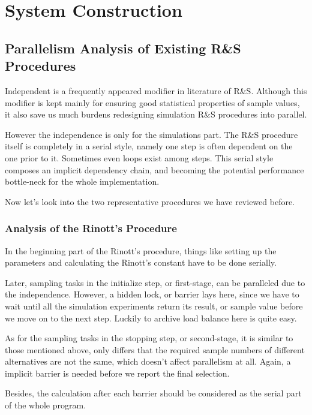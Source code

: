\chapter{System Construction}

\section{Parallelism Analysis of Existing R\&S Procedures}

Independent is a frequently appeared modifier in literature of R\&S. Although this modifier is kept mainly for ensuring good statistical properties of sample values, it also save us much burdens redesigning simulation R\&S procedures into parallel.

However the independence is only for the simulations part. The R\&S procedure itself is completely in a serial style, namely one step is often dependent on the one prior to it. Sometimes even loops exist among steps. This serial style composes an implicit dependency chain, and becoming the potential performance bottle-neck for the whole implementation.

Now let's look into the two representative procedures we have reviewed before.

\subsection{Analysis of the Rinott's Procedure}

In the beginning part of the Rinott's procedure, things like setting up the parameters and calculating the Rinott's constant have to be done serially.

Later, sampling tasks in the initialize step, or first-stage, can be paralleled due to the independence. However, a hidden lock, or barrier lays here, since we have to wait until all the simulation experiments return its result, or sample value before we move on to the next step. Luckily to archive load balance here is quite easy.

As for the sampling tasks in the stopping step, or second-stage, it is similar to those mentioned above, only differs that the required sample numbers of different alternatives are not the same, which doesn't affect parallelism at all. Again, a implicit barrier is needed before we report the final selection.

Besides, the calculation after each barrier should be considered as the serial part of the whole program.

